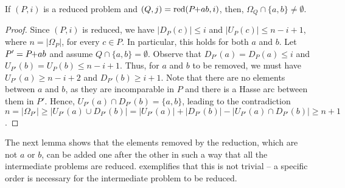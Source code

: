 \documentclass[a4paper,UKenglish,cleveref, autoref, thm-restate]{lipics-v2021}
\newcommand{\pchild}[3]{{#1}\kern-1pt{+}{#2}{#3}}
\newcommand{\reduced}[1]{\operatorname{red}#1}
\newcommand{\less}[2]{D_{#1}(#2)}
\newcommand{\greater}[2]{U_{#1}(#2)}
\begin{document}
\begin{lemma} \label{lemma:remove_only_last_element_edge}
  If $(P, i)$ is a reduced problem and $(Q, j) = \reduced{(\pchild{P}{a}{b}, i)}$, then, $\Omega_Q \cap \{a, b\} \neq \emptyset$.
\end{lemma}

\begin{proof}
  Since $(P, i)$ is reduced, we have $|\less{P}{c}| \leq i$ and $|\greater{P}{c}| \leq n - i + 1$, where $n = |\Omega_P|$, for every $c \in P$.
  In particular, this holds for both $a$ and $b$.
  Let $P' = \pchild{P}{a}{b}$ and assume $Q \cap \{a, b\} = \emptyset$.
  Observe that $\less{P'}{a} = \less{P}{a} \leq i$ and $\greater{P'}{b} = \greater{P}{b} \leq n - i + 1$.
  Thus, for $a$ and $b$ to be removed, we must have $\greater{P'}{a} \geq n - i + 2$ and $\less{P'}{b} \geq i + 1$.
  Note that there are no elements between $a$ and $b$, as they are incomparable in $P$ and there is a Hasse arc between them in $P'$.
  Hence, $\greater{P'}{a} \cap \less{P'}{b} = \{a, b\}$, leading to the contradiction $n = |\Omega_{P'}| \ge |\greater{P'}{a} \cup \less{P'}{b}| = |\greater{P'}{a}| + |\less{P'}{b}| - |\greater{P'}{a} \cap \less{P'}{b}| \ge n + 1$.
\end{proof}

The next lemma shows that the elements removed by the reduction, which are not $a$ or $b$, can be added one after the other in such a way that all the intermediate problems are reduced.
 exemplifies that this is not trivial -- a specific order is necessary for the intermediate problem to be reduced.
\end{document}
